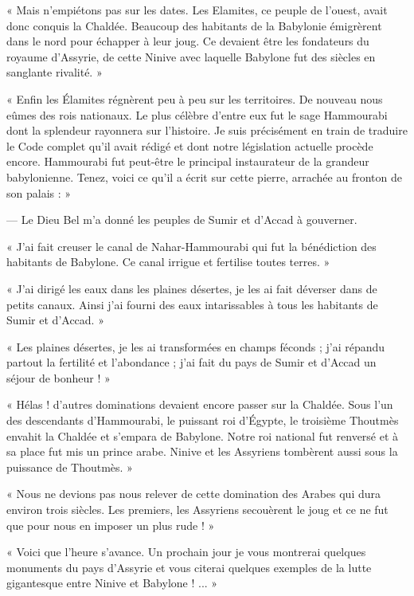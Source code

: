 \documentclass[a4paper, 11pt, oneside, polutonikogreek, french]{article}
\begin{document}
\bigskip
\centerline{\EightStarTaper}
\centerline{\EightStarTaper\EightStarTaper}
\bigskip

« Mais n'empiétons pas sur les dates. Les Elamites, ce peuple de l'ouest, avait donc conquis la Chaldée. Beaucoup des habitants de la Babylonie émigrèrent dans le nord pour échapper à leur joug. Ce devaient être les fondateurs du royaume d'Assyrie, de cette Ninive avec laquelle Babylone fut des siècles en sanglante rivalité. »

« Enfin les Élamites régnèrent peu à peu sur les territoires. De nouveau nous eûmes des rois nationaux. Le plus célèbre d'entre eux fut le sage Hammourabi dont la splendeur rayonnera sur l'histoire. Je suis précisément en train de traduire le Code complet qu'il avait rédigé et dont notre législation actuelle procède encore. Hammourabi fut peut-être le principal instaurateur de la grandeur babylonienne. Tenez, voici ce qu'il a écrit sur cette pierre, arrachée au fronton de son palais : »

--- Le Dieu Bel m'a donné les peuples de Sumir et d'Accad à gouverner.

« J'ai fait creuser le canal de Nahar-Hammourabi qui fut la bénédiction des habitants de Babylone. Ce canal irrigue et fertilise toutes terres. »

« J'ai dirigé les eaux dans les plaines désertes, je les ai fait déverser dans de petits canaux. Ainsi j'ai fourni des eaux intarissables à tous les habitants de Sumir et d'Accad. »

« Les plaines désertes, je les ai transformées en champs féconds ; j'ai répandu partout la fertilité et l'abondance ; j'ai fait du pays de Sumir et d'Accad un séjour de bonheur ! »

« Hélas ! d'autres dominations devaient encore passer sur la Chaldée. Sous l'un des descendants d'Hammourabi, le puissant roi d'Égypte, le troisième Thoutmès envahit la Chaldée et s'empara de Babylone. Notre roi national fut renversé et à sa place fut mis un prince arabe. Ninive et les Assyriens tombèrent aussi sous la puissance de Thoutmès. »

« Nous ne devions pas nous relever de cette domination des Arabes qui dura environ trois siècles. Les premiers, les Assyriens secouèrent le joug et ce ne fut que pour nous en imposer un plus rude ! »

« Voici que l'heure s'avance. Un prochain jour je vous montrerai quelques monuments du pays d'Assyrie et vous citerai quelques exemples de la lutte gigantesque entre Ninive et Babylone ! ... »
\end{document}
